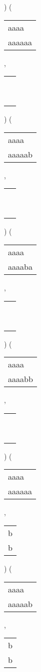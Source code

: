) 
 ( 
\begin{tabular}{|l|} \hline
aaaa\ \  \\
aaaaaa \\
\hline
\end{tabular} 
 , 
\begin{tabular}{|l|} \hline
\ \\ \ \\ \hline
\end{tabular} 
) 
 ( 
\begin{tabular}{|l|} \hline
aaaa\ \  \\
aaaaab \\
\hline
\end{tabular} 
 , 
\begin{tabular}{|l|} \hline
\ \\ \ \\ \hline
\end{tabular} 
) 
 ( 
\begin{tabular}{|l|} \hline
aaaa\ \  \\
aaaaba \\
\hline
\end{tabular} 
 , 
\begin{tabular}{|l|} \hline
\ \\ \ \\ \hline
\end{tabular} 
) 
 ( 
\begin{tabular}{|l|} \hline
aaaa\ \  \\
aaaabb \\
\hline
\end{tabular} 
 , 
\begin{tabular}{|l|} \hline
\ \\ \ \\ \hline
\end{tabular} 
) 
 ( 
\begin{tabular}{|l|} \hline
aaaa\ \  \\
aaaaaa \\
\hline
\end{tabular} 
 , 
\begin{tabular}{|l|} \hline
b \\
b \\
\hline
\end{tabular} 
) 
 ( 
\begin{tabular}{|l|} \hline
aaaa\ \  \\
aaaaab \\
\hline
\end{tabular} 
 , 
\begin{tabular}{|l|} \hline
b \\
b \\
\hline
\end{tabular} 
